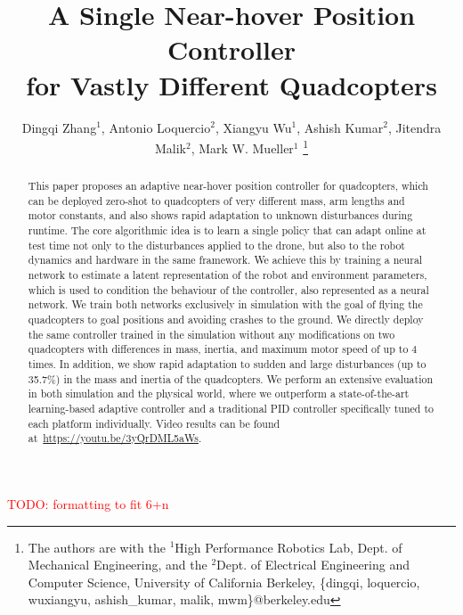 \documentclass[letterpaper, 10 pt, conference]{ieeeconf}  %
\title{\LARGE \bf
A Single Near-hover Position Controller\\for Vastly Different Quadcopters
}
\author{Dingqi Zhang$^1$, Antonio Loquercio$^2$, Xiangyu Wu$^1$, Ashish Kumar$^2$, Jitendra Malik$^2$, Mark W. Mueller$^1$%
\thanks{The authors are with the $^1$High Performance Robotics Lab, Dept. of Mechanical Engineering, and the $^2$Dept. of Electrical Engineering and Computer Science, University of California Berkeley, \{dingqi, loquercio, wuxiangyu, ashish\_kumar, malik, mwm\}@berkeley.edu} 
}
\newcommand{\todo}[1]{\textcolor{red}{TODO: #1}}
\begin{document}
\maketitle
\maketitle
\thispagestyle{empty}
\pagestyle{empty}

\todo{formatting to fit 6+n}





\begin{abstract}
This paper proposes an adaptive near-hover position controller for quadcopters, which can be deployed zero-shot to quadcopters of very different mass, arm lengths and motor constants, and also shows rapid adaptation to unknown disturbances during runtime. The core algorithmic idea is to learn a single policy that can adapt online at test time not only to the disturbances applied to the drone, but also to the robot dynamics and hardware in the same framework.
We achieve this by training a neural network to estimate a latent representation of the robot and environment parameters, which is used to condition the behaviour of the controller, also represented as a neural network. We train both networks exclusively in simulation with the goal of flying the quadcopters to goal positions and avoiding crashes to the ground. We directly deploy the same controller trained in the simulation without any modifications on two quadcopters with differences in mass, inertia, and maximum motor speed of up to 4 times. In addition, we show rapid adaptation to sudden and large disturbances (up to 35.7\%) in the mass and inertia of the quadcopters. We perform an extensive evaluation in both simulation and the physical world, where we outperform a state-of-the-art learning-based adaptive controller and a traditional PID controller specifically tuned to each platform individually. Video results can be found at~\url{https://youtu.be/3yQrDML5aWs}. %

\end{abstract}
\end{document}
